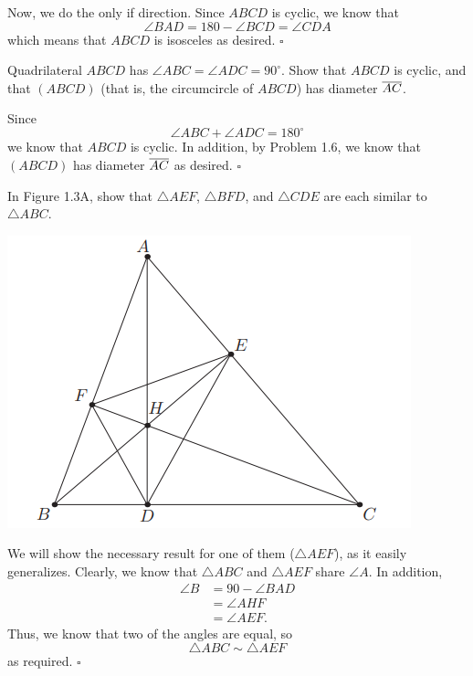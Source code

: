 \documentclass{article}
\begin{document}
Now, we do the only if direction. Since $ABCD$ is cyclic, we know that \[\angle BAD = 180-\angle BCD = \angle CDA\] which means that $ABCD$ is isosceles as desired. $\square$

\begin{problem}[1.11]{}
Quadrilateral $ABCD$ has $\angle ABC = \angle ADC = 90^\circ$. Show that $ABCD$ is cyclic, and that $(ABCD)$ (that is, the circumcircle of $ABCD$) has diameter $\overline{AC}$.
\end{problem}
Since \[\angle ABC + \angle ADC = 180^\circ\] we know that $ABCD$ is cyclic. In addition, by Problem 1.6, we know that $(ABCD)$ has diameter $\overline{AC}$ as desired. $\square$

\begin{problem}[1.16]{}
In Figure 1.3A, show that $\triangle AEF$, $\triangle BFD$, and $\triangle CDE$ are each similar to $\triangle ABC$.

\begin{center}
\includegraphics[width=0.5\linewidth]{Figure 1.3A.png}
\end{center}
\end{problem}
We will show the necessary result for one of them ($\triangle AEF$), as it easily generalizes. Clearly, we know that $\triangle ABC$ and $\triangle AEF$ share $\angle A$. In addition, 
\begin{align*}
\angle B &= 90-\angle BAD \\
&= \angle AHF \\
&= \angle AEF.
\end{align*}
Thus, we know that two of the angles are equal, so \[\triangle ABC \sim \triangle AEF\] as required. $\square$
\end{document}
